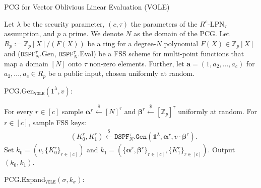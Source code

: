 \begin{specialconstruction}{PCG for Vector Oblivious Linear Evaluation (VOLE)}
\label{construction:PCGforVOLEImpl}

\vspace{1em}

Let $\lambda$ be the security parameter, $(c,\tau)$ the parameters of the $R^c$-LPN$_\tau$ assumption, and $p$ a prime. We denote $N$ as the domain of the PCG. Let $R_p:=\mathbb{Z}_{p}[X]/(F(X))$ be a ring for a degree-$N$ polynomial $F(X) \in \mathbb{Z}_{p}[X]$ and ($\texttt{DSPF}^{\tau}_{N}$.Gen, $\texttt{DSPF}^{\tau}_{N}$.Eval) be a FSS scheme for multi-point functions that map a domain $[N]$ onto $\tau$ non-zero elements. Further, let $\boldsymbol{a} = (1, a_2, ..., a_c)$ for $a_2, ...,a_c \in R_p$ be a public input, chosen uniformly at random.

\vspace{1em}

PCG.Gen$_{\texttt{VOLE}}(1^\lambda, v)$:

\begin{algorithmic}[1]
\State For every $r \in [c]$ sample $\boldsymbol{\alpha}^{r} \stackrel{\$}{\leftarrow}[N]^{\tau}$ and $\boldsymbol{\beta}^{r} \stackrel{\$}{\leftarrow} [\mathbb{Z}_{p}]^{\tau}$ uniformly at random.
\State For $r \in [c]$, sample FSS keys:
\begin{align*}
& \left(K_{0}^{r}, K_{1}^{r}\right) \stackrel{\$}{\leftarrow} \texttt{DSPF}^{\tau}_{N}\texttt{.Gen}\left(\mathds{1}^{\lambda}, \boldsymbol{\alpha}^{r}, v \cdot \boldsymbol{\beta}^{r}\right).
\end{align*}
\State Set $k_0 = (v, \{K_0^{r}\}_{r\in[c]})$ and $k_1 = (\{\boldsymbol{\alpha}^r, \boldsymbol{\beta}^r\}_{r\in[c]}, \{K_1^{r}\}_{r\in[c]})$.
\State Output $(k_0, k_1)$.
\end{algorithmic}

\vspace{1em} %

PCG.Expand$_{\texttt{VOLE}}(\sigma, k_\sigma)$:


\end{specialconstruction}
